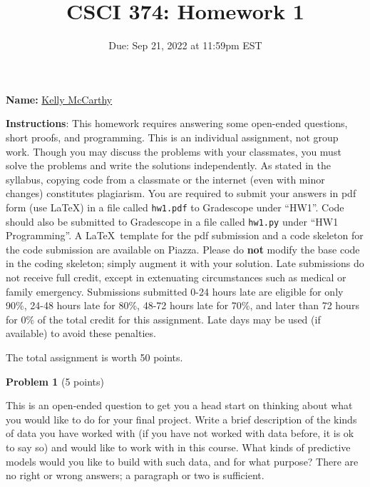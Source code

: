 \documentclass[letterpaper, 11pt]{article}
\title{CSCI 374: Homework 1}
\author{}
\date{Due: Sep 21, 2022 at 11:59pm EST}
\begin{document}
\maketitle

\setlength{\parindent}{0em}
\setlength{\parskip}{0.8em}

\textbf{Name:} \underline{\hspace{30pt} \color{blue} Kelly McCarthy \hspace{30pt}}
\vspace{1em}

	\textbf{Instructions}: This homework requires answering some open-ended questions, short proofs, and
	programming. This is an individual assignment, not group work. Though you may
	discuss the problems with your classmates, you must solve the problems and
	write the solutions independently. As stated in the syllabus, copying code
	from a classmate or the internet (even with minor changes) constitutes
	plagiarism. You are required to submit your answers in pdf form (use \LaTeX)
	in a file called \texttt{hw1.pdf} to Gradescope under ``HW1''. Code should also be submitted to Gradescope in a file called \texttt{hw1.py} under ``HW1 Programming''. A \LaTeX\  template for the pdf submission and a code skeleton for the code submission are available on Piazza. Please do \textbf{not} modify the base code in the coding skeleton; simply augment it with your solution.
	Late submissions do not receive full credit, except in extenuating circumstances such
	as medical or family emergency. Submissions submitted 0-24 hours late are eligible for only 90\%, 24-48 hours late for 80\%, 48-72 hours late for 70\%, and later
    than 72 hours for 0\% of the total credit for this assignment. Late days may be used (if available) to avoid these penalties.

    The total assignment is worth 50 points.

\vspace{1em}

{\large\textbf{Problem 1}} (5 points)

This is an open-ended question to get you a head start on thinking about what you would like to do for your final project. Write a brief description of the kinds of data you have worked with (if you have not worked with data before, it is ok to say so) and would like to work with in this course. What kinds of predictive models would you like to build with such data, and for what purpose? There are no right or wrong answers; a paragraph or two is sufficient.
\end{document}

